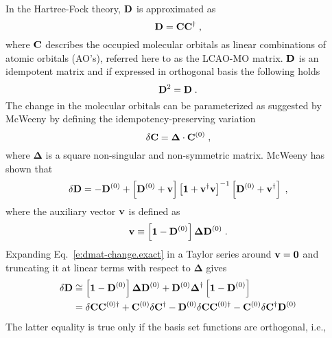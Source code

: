 \documentclass[aip,graphicx]{revtex4-1}
\newcommand{\BM}[1]{\bm{#1}}
\begin{document}
In the Hartree\hyp{}Fock theory, ${\bf D}$ is approximated as
%
\begin{equation}
 {\bf D} = {\bf C}{\bf C}^\dagger \;,
\end{equation}
%
where ${\bf C}$ describes the occupied molecular orbitals as linear combinations
of atomic orbitals (AO's), referred here to as the LCAO-MO matrix.
${\bf D}$ is an idempotent matrix and if expressed in orthogonal basis the following holds
%
\begin{equation}
 {\bf D}^2 = {\bf D} \;.
\end{equation}
%
The change in the molecular orbitals can be parameterized as suggested by McWeeny\cite{McWeeny.RevModPhys.1960}
by defining the idempotency\hyp{}preserving variation
%
\begin{equation}
 \delta {\bf C} = {\BM\Delta} \cdot {\bf C}^{(0)} \;,
\end{equation}
%
where $\BM\Delta$ is a square non\hyp{}singular and non\hyp{}symmetric matrix.
McWeeny has shown that
%
\begin{equation} \label{e:dmat-change.exact}
 \delta {\bf D} = -{\bf D}^{(0)} + \left[ {\bf D}^{(0)} + {\bf v} \right]
                                   \left[ {\bf 1} + {\bf v}^\dagger{\bf v} \right]^{-1}
                                   \left[ {\bf D}^{(0)} + {\bf v}^\dagger \right] \;,
\end{equation}
%
where the auxiliary vector ${\bf v}$ is defined as
%
\begin{equation}
 {\bf v} \equiv \left[ {\bf 1} - {\bf D}^{(0)} \right] {\BM\Delta} {\bf D}^{(0)}  \;.
\end{equation}
%
Expanding Eq.~\eqref{e:dmat-change.exact} in a Taylor series around ${\bf v}={\bf 0}$ and
truncating it at linear terms with respect to ${\BM\Delta}$ gives
%
\begin{subequations} 
 \begin{align}
 \delta {\bf D} &\cong \left[ {\bf 1} - {\bf D}^{(0)} \right] {\BM\Delta} {\bf D}^{(0)} + 
                        {\bf D}^{(0)} {\BM\Delta}^\dagger \left[ {\bf 1} - {\bf D}^{(0)} \right]  
 \label{e:dD-1} \\  &= 
  \delta {\bf C}  {\bf C}^{(0)\dagger} + {\bf C}^{(0)}\delta {\bf C}^\dagger
           - {\bf D}^{(0)} \delta {\bf C}  {\bf C}^{{(0)}\dagger} - {\bf C}^{(0)}\delta {\bf C}^\dagger {\bf D}^{(0)} 
 \label{e:dD-2}
 \end{align}
\end{subequations}
%
The latter equality is true only if the basis set functions are orthogonal, i.e., 
\end{document}
